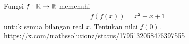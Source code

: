 Fungsi $f:\mathbb R \to \mathbb R$ memenuhi
\begin{align*}
    f(f(x)) = x^2-x+1
\end{align*}
untuk semua bilangan real $x$. Tentukan nilai $f(0)$.
\url{https://x.com/mathssolutionz/status/1795132058475397555}